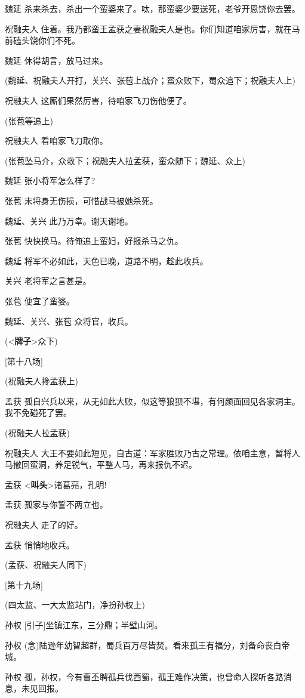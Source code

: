 魏延 杀来杀去，杀出一个蛮婆来了。呔，那蛮婆少要送死，老爷开恩饶你去罢。

祝融夫人
住着。我乃都蛮王孟获之妻祝融夫人是也。你们知道咱家厉害，就在马前磕头饶你们不死。

魏延 休得胡言，放马过来。

(魏延、祝融夫人开打，关兴、张苞上战介；蛮众败下，蜀众追下；祝融夫人上)

祝融夫人 这厮们果然厉害，待咱家飞刀伤他便了。

(张苞等追上)

祝融夫人 看咱家飞刀取你。

(张苞坠马介，众救下；祝融夫人拉孟获，蛮众随下；魏延、众上)

魏延 张小将军怎么样了?

张苞 末将身无伤损，可惜战马被她杀死。

魏延、关兴 此乃万幸。谢天谢地。

张苞 快快换马。待俺追上蛮妇，好报杀马之仇。

魏延 将军不必如此，天色已晚，道路不明，趁此收兵。

关兴 老将军之言甚是。

张苞 便宜了蛮婆。

魏延、关兴、张苞 众将官，收兵。

(\textless{}\textbf{牌子}\textgreater{}众下)

{[}第十八场{]}

(祝融夫人搀孟获上)

孟获
孤自兴兵以来，从无如此大败，似这等狼狈不堪，有何颜面回见各家洞主。我不免碰死了罢。

(祝融夫人拉孟获)

祝融夫人
大王不要如此短见，自古道：军家胜败乃古之常理。依咱主意，暂将人马撤回蛮洞，养足锐气，平整人马，再来报仇不迟。

孟获 \textless{}\textbf{叫头}\textgreater{}诸葛亮，孔明!

孟获 孤家与你誓不两立也。

祝融夫人 走了的好。

孟获 悄悄地收兵。

(孟获、祝融夫人同下)

{[}第十九场{]}

(四太监、一大太监站门，净扮孙权上)

孙权 {[}引子{]}坐镇江东，三分鼎；半壁山河。

孙权
(念)陆逊年幼智超群，蜀兵百万尽皆焚。看来孤王有福分，刘备命丧白帝城。

孙权
孤，孙权，今有曹丕聘孤兵伐西蜀，孤王难作决策，也曾命人探听各路消息，未见回报。

